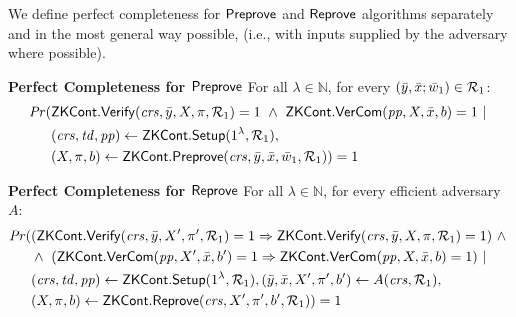 \begin{definition}[ZK Continuations]
\noindent We define perfect completeness for ${\mathsf{Preprove}}$ and ${\mathsf{Reprove}}$ algorithms separately and in the most general way possible,
(i.e., with inputs supplied by the adversary where possible).  

\noindent \textbf{Perfect Completeness for ${\mathsf{Preprove}}$} For all $\lambda \in \mathbb{N}$, for every $(\bar{y}, \bar{x}; \bar{w}_1) \in \mathcal{R}_1$:
\begin{align*}
\mathit{Pr} (& \ZKCont.\Verify(\crs, \bar{y}, X, \pi, \relone) = 1 \ \wedge \ \ZKCont.\VerifyCom (\pp, X, \barx, b) = 1\  | \ \\ 
                   & (\crs, \tw, \pp) \leftarrow \ZKCont.\Setup (1^{\lambda}, \relone), \\ 
                   & (X, \pi, b) \leftarrow \ZKCont.\Preprove(\crs, \bar{y}, \bar{x}, \baromega_1, \relone)) = 1
\end{align*}

\noindent \textbf{Perfect Completeness for ${\mathsf{Reprove}}$} For all $\lambda \in \mathbb{N}$, for every efficient adversary $A$: 
\begin{align*}
\mathit{Pr} (& (\ZKCont.\Verify(\crs, \bar{y}, X', \pi', \relone) = 1  \Rightarrow \ZKCont.\Verify(\crs, \bar{y}, X, \pi, \relone) = 1)  \ \wedge \  \\
                   & \wedge \ (\ZKCont.\VerifyCom (\pp, X', \barx, b') = 1 \Rightarrow \ZKCont.\VerifyCom (\pp, X, \barx, b) = 1) \ | \\
                   & (\crs, \tw, \pp) \leftarrow \ZKCont.\Setup (1^{\lambda}, \relone),  (\bary, \barx, X', \pi', b') \leftarrow A(\crs,\relone), \\
                   & (X, \pi, b) \leftarrow \ZKCont.\Reprove(\crs, X', \pi', b', \relone)) = 1
\end{align*}

\begin{comment}
\begin{align*}
\mathit{Pr} (& (\ZKCont.\Verify(\crs, \bar{y}, X, \pi, \relone) = 1  = >  \ZKCont.\Verify(\crs, \bar{y}, X', \pi', \relone) = 1)  \ \wedge \  \\
                   & \wedge \ (\ZKCont.\VerifyCom (\pp, X, \barx, b) = 1 => \ZKCont.\VerifyCom (\pp, X', \barx, b') = 1) \ | \\
                   & (\crs, \tw, \pp) \leftarrow \ZKCont.\Setup (1^{\lambda}, \relone), \\ 
                   & (\bary, \barx, X, \pi, b) \leftarrow A(\crs,\pp, \relone) \\
                   & (X', \pi', b') \leftarrow \ZKCont.\Reprove(\crs, X, \pi, b, \relone)) = 1
\end{align*}
\end{comment}


\end{definition}
